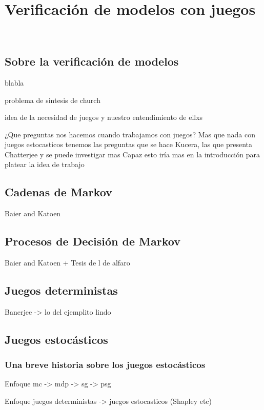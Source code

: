 \chapter{Verificación de modelos con juegos}
~\label{cap:approach}

\section{Sobre la verificación de modelos}

blabla

problema de sintesis de church

idea de la necesidad de juegos y nuestro entendimiento de ellxs

¿Que preguntas nos hacemos cuando trabajamos con juegos? Mas que nada con juegos estocasticos
tenemos las preguntas que se hace Kucera, las que presenta Chatterjee y se puede investigar mas
Capaz esto iría mas en la introducción para platear la idea de trabajo

\section{Cadenas de Markov}

Baier and Katoen

\section{Procesos de Decisión de Markov}

Baier and Katoen + Tesis de l de alfaro

\section{Juegos deterministas}

Banerjee -> lo del ejemplito lindo

\section{Juegos estocásticos}

\subsection{Una breve historia sobre los juegos estocásticos}

Enfoque mc -> mdp -> sg -> psg

Enfoque juegos deterministas -> juegos estocasticos (Shapley etc)

